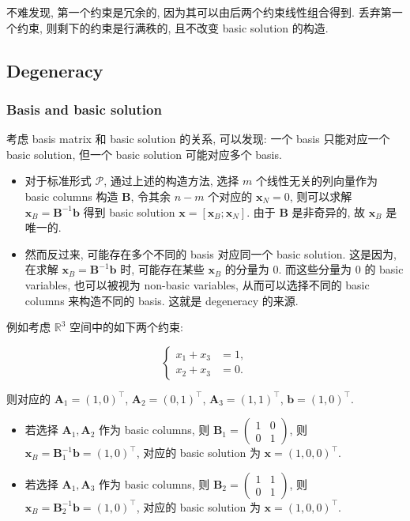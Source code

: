 不难发现, 第一个约束是冗余的, 因为其可以由后两个约束线性组合得到. 丢弃第一个约束, 则剩下的约束是行满秩的, 且不改变 basic solution 的构造.

\subsection{Degeneracy}

\subsubsection{Basis and basic solution}

考虑 basis matrix 和 basic solution 的关系, 可以发现: 一个 basis 只能对应一个 basic solution, 但一个 basic solution 可能对应多个 basis.

\begin{itemize}
\item {}对于标准形式 $\mathcal{P}$, 通过上述的构造方法, 选择 $m$ 个线性无关的列向量作为 basic columns 构造 $\bm{B}$, 令其余 $n-m$ 个对应的 $\bm{x}_N = 0$, 则可以求解 $\bm{x}_B = \bm{B}^{-1}\bm{b}$ 得到 basic solution $\bm{x} = [\bm{x}_B; \bm{x}_N]$. 由于 $\bm{B}$ 是非奇异的, 故 $\bm{x}_B$ 是唯一的.


\item {}然而反过来, 可能存在多个不同的 basis 对应同一个 basic solution. 这是因为, 在求解 $\bm{x}_B = \bm{B}^{-1}\bm{b}$ 时, 可能存在某些 $\bm{x}_B$ 的分量为 $0$. 而这些分量为 $0$ 的 basic variables, 也可以被视为 non-basic variables, 从而可以选择不同的 basic columns 来构造不同的 basis. 这就是 degeneracy 的来源.


\end{itemize}

例如考虑 $\mathbb{R}^3$ 空间中的如下两个约束:

\[
\begin{cases}
  x_1 + x_3 &= 1,\\
  x_2 + x_3 &= 0.
\end{cases}
\]

则对应的 $\bm{A}_1 = (1, 0)^\top$, $\bm{A}_2 = (0, 1)^\top$, $\bm{A}_3 = (1, 1)^\top$, $\bm{b} = (1, 0)^\top$.

\begin{itemize}
\item {}若选择 $\bm{A}_1, \bm{A}_2$ 作为 basic columns, 则 $\bm{B}_1 = \begin{pmatrix} 1 & 0 \\ 0 & 1 \end{pmatrix}$, 则 $\bm{x}_B = \bm{B}_1^{-1} \bm{b} = (1, 0)^\top$, 对应的 basic solution 为 $\bm{x} = (1, 0, 0)^\top$.


\item {}若选择 $\bm{A}_1, \bm{A}_3$ 作为 basic columns, 则 $\bm{B}_2 = \begin{pmatrix} 1 & 1 \\ 0 & 1 \end{pmatrix}$, 则 $\bm{x}_B = \bm{B}_2^{-1} \bm{b} = (1, 0)^\top$, 对应的 basic solution 为 $\bm{x} = (1, 0, 0)^\top$.


\end{itemize}

